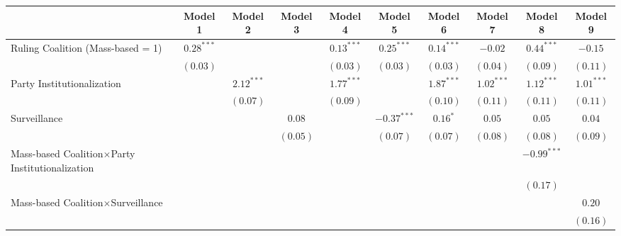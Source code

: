 
\begin{table}
\begin{center}
\begin{tabular}{l c c c c c c c c c}
\hline
 & Model 1 & Model 2 & Model 3 & Model 4 & Model 5 & Model 6 & Model 7 & Model 8 & Model 9 \\
\hline
Ruling Coalition (Mass-based = 1)                      & $0.28^{***}$ &              &          & $0.13^{***}$ & $0.25^{***}$  & $0.14^{***}$ & $-0.02$       & $0.44^{***}$  & $-0.15$       \\
                                                       & $(0.03)$     &              &          & $(0.03)$     & $(0.03)$      & $(0.03)$     & $(0.04)$      & $(0.09)$      & $(0.11)$      \\
Party Institutionalization                             &              & $2.12^{***}$ &          & $1.77^{***}$ &               & $1.87^{***}$ & $1.02^{***}$  & $1.12^{***}$  & $1.01^{***}$  \\
                                                       &              & $(0.07)$     &          & $(0.09)$     &               & $(0.10)$     & $(0.11)$      & $(0.11)$      & $(0.11)$      \\
Surveillance                                           &              &              & $0.08$   &              & $-0.37^{***}$ & $0.16^{*}$   & $0.05$        & $0.05$        & $0.04$        \\
                                                       &              &              & $(0.05)$ &              & $(0.07)$      & $(0.07)$     & $(0.08)$      & $(0.08)$      & $(0.09)$      \\
Mass-based Coalition$\times$Party Institutionalization &              &              &          &              &               &              &               & $-0.99^{***}$ &               \\
                                                       &              &              &          &              &               &              &               & $(0.17)$      &               \\
Mass-based Coalition$\times$Surveillance               &              &              &          &              &               &              &               &               & $0.20$        \\
                                                       &              &              &          &              &               &              &               &               & $(0.16)$      \\

\end{tabular}
\end{center}
\end{table}
